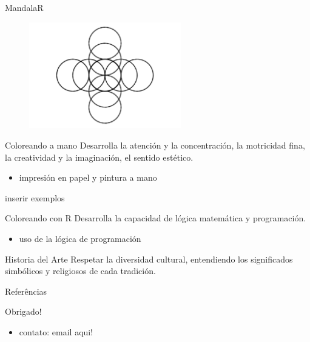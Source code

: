 \documentclass[
  ignorenonframetext,
]{beamer}
\providecommand{\tightlist}{%
  \setlength{\itemsep}{0pt}\setlength{\parskip}{0pt}}\usepackage{longtable,booktabs,array}
\begin{document}
\begin{frame}[fragile]{MandalaR}
\begin{figure}

{\centering \includegraphics[width=2.60417in,height=\textheight]{Teste_quarto_files/figure-beamer/unnamed-chunk-22-1.pdf}

}

\end{figure}
\end{frame}

\begin{frame}{Coloreando a mano}
\protect\hypertarget{coloreando-a-mano}{}
Desarrolla la atención y la concentración, la motricidad fina, la
creatividad y la imaginación, el sentido estético.

\begin{itemize}
\tightlist
\item
  impresión en papel y pintura a mano
\end{itemize}

inserir exemplos
\end{frame}

\begin{frame}{Coloreando con R}
\protect\hypertarget{coloreando-con-r}{}
Desarrolla la capacidad de lógica matemática y programación.

\begin{itemize}
\tightlist
\item
  uso de la lógica de programación
\end{itemize}
\end{frame}

\begin{frame}{Historia del Arte}
\protect\hypertarget{historia-del-arte}{}
Respetar la diversidad cultural, entendiendo los significados simbólicos
y religiosos de cada tradición.
\end{frame}

\begin{frame}{Referências}
\protect\hypertarget{referuxeancias}{}
\tiny
\end{frame}

\begin{frame}{Obrigado!}
\protect\hypertarget{obrigado}{}
\begin{itemize}
\tightlist
\item
  contato: email aqui!
\end{itemize}
\end{frame}
\end{document}
